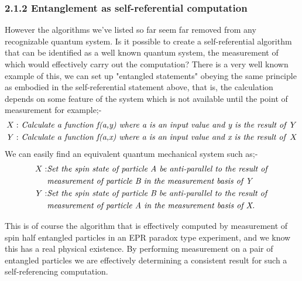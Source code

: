 \documentclass[
   ,final            %
  ]
  {aipproc}
\begin{document}
\subsubsection{2.1.2 Entanglement as self-referential computation }
\par
However the algorithms we've listed so far seem far removed from any recognizable quantum system. Is
it possible to create a self-referential algorithm that can be identified as a well known quantum system, the
measurement of which would effectively carry out the computation? There is a very well known example
of this, we can set up "entangled statements" obeying the same principle as embodied in the self-referential
statement above, that is, the calculation depends on some feature of the system which is not available until
the point of measurement for example;-
\begin{equation}
\begin{aligned}
X:&\text{\emph{ Calculate a function f(a,y) where a is an input value and y is the result of }}Y\\
Y:&\text{\emph{ Calculate a function f(a,x) where a is an input value and x is the result of }}X\\
\end{aligned}
\end{equation}
We can easily find an equivalent quantum mechanical system such as;-
\begin{equation}
\begin{aligned}
X:&\text{\emph{Set the spin state of particle A be anti-parallel to the result of}} \\ 
  &\text{\emph{measurement of particle B in the measurement basis of Y}}\\
Y:&\text{\emph{Set the spin state of particle B be anti-parallel to the result of}}\\
  &\text{\emph{measurement of particle A in the measurement basis of X.}}\\
\end{aligned}
\end{equation}
\par
This is of course the algorithm that is effectively computed by measurement of spin half entangled particles
in an EPR paradox type experiment, and we know this has a real physical existence. By performing measurement
on a pair of entangled particles we are effectively determining a consistent result for such a self-referencing
computation.
\end{document}
